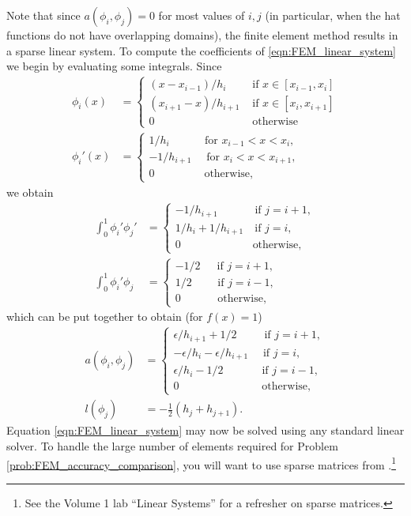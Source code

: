 Note that since $a(\phi_i,\phi_j) = 0$ for most values of $i, j$ (in particular, when the hat functions do not have overlapping domains), the finite element method results in a sparse linear system.
To compute the coefficients of \eqref{eqn:FEM_linear_system} we begin by evaluating some integrals.
Since
\begin{align*}
\phi_i(x) &= \begin{cases}
(x - x_{i-1})/h_i &\text{ if } x \in [x_{i-1},x_i]\\
 (x_{i+1} - x)/h_{i+1}  &\text{ if } x \in [x_{i},x_{i+1}]\\
0 &\text{ otherwise}
\end{cases}
\\
\phi_i'(x) &= \begin{cases}
1/h_i \quad \quad \quad \, \text{for } x_{i-1} < x < x_i,\\
 -1/h_{i+1} \quad \text{ for } x_{i} < x < x_{i+1},\\
0 \quad \quad \quad \quad \, \text{ otherwise},
\end{cases}
\end{align*}
we obtain
\begin{align*}
\int_0^1  \phi_i'\phi_j' &= \begin{cases}
- 1/h_{i+1} \quad \quad \quad \text{ if } j=i+1,\\
1/h_i + 1/h_{i+1} \quad \text{if } j=i,\\
0 \quad \quad \quad \quad \quad \quad \, \text{ otherwise},
\end{cases} \\
\int_0^1  \phi_i'\phi_j &= \begin{cases}
- 1/2 \quad \,\text{ if } j=i+1,\\
1/2 \quad \quad \text{ if } j=i-1,\\
0 \quad \quad \quad \text{ otherwise},
\end{cases}
\end{align*}
which can be put together to obtain (for \(f(x)=1\))
\begin{align}
a(\phi_i,\phi_j) &= \begin{cases}
\epsilon/h_{i+1} + 1/2 \quad \quad \, \text{ if } j=i+1,\\
-\epsilon/h_i -\epsilon/h_{i+1} \quad  \text{ if } j=i,\\
\epsilon/h_i - 1/2 \quad \quad \quad \, \text{ if } j=i-1,\\
0 \quad \quad \quad \quad \quad \quad \,\,\,\,\,\,\, \text{ otherwise},
\end{cases}
\label{eqn:FEM:a_definition}
\\
l(\phi_j) &= -\frac{1}{2}(h_j + h_{j+1}).
\label{eqn:FEM:l_definition}
\end{align}
Equation \eqref{eqn:FEM_linear_system} may now be solved using any standard linear solver. 
To handle the large number of elements required for Problem \ref{prob:FEM_accuracy_comparison}, you will want to use sparse matrices from .\footnote{See the Volume 1 lab ``Linear Systems'' for a refresher on sparse matrices.}

